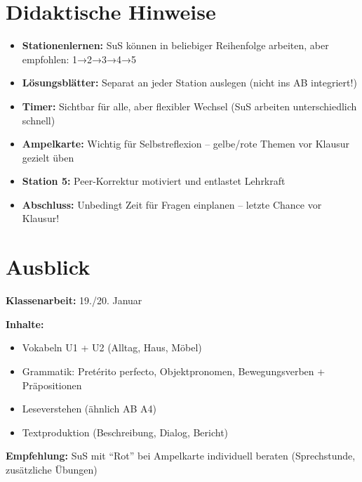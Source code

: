 \documentclass[11pt, a4paper]{article}
\begin{document}

\section*{Didaktische Hinweise}

\begin{itemize}[leftmargin=1.5em]
    \item \textbf{Stationenlernen:} SuS können in beliebiger Reihenfolge arbeiten, aber empfohlen: 1→2→3→4→5
    \item \textbf{Lösungsblätter:} Separat an jeder Station auslegen (nicht ins AB integriert!)
    \item \textbf{Timer:} Sichtbar für alle, aber flexibler Wechsel (SuS arbeiten unterschiedlich schnell)
    \item \textbf{Ampelkarte:} Wichtig für Selbstreflexion -- gelbe/rote Themen vor Klausur gezielt üben
    \item \textbf{Station 5:} Peer-Korrektur motiviert und entlastet Lehrkraft
    \item \textbf{Abschluss:} Unbedingt Zeit für Fragen einplanen -- letzte Chance vor Klausur!
\end{itemize}


\section*{Ausblick}

\textbf{Klassenarbeit:} 19./20. Januar

\textbf{Inhalte:}
\begin{itemize}[leftmargin=1.5em, itemsep=0pt]
    \item Vokabeln U1 + U2 (Alltag, Haus, Möbel)
    \item Grammatik: Pretérito perfecto, Objektpronomen, Bewegungsverben + Präpositionen
    \item Leseverstehen (ähnlich AB A4)
    \item Textproduktion (Beschreibung, Dialog, Bericht)
\end{itemize}

\textbf{Empfehlung:} SuS mit ``Rot'' bei Ampelkarte individuell beraten (Sprechstunde, zusätzliche Übungen)
\end{document}
